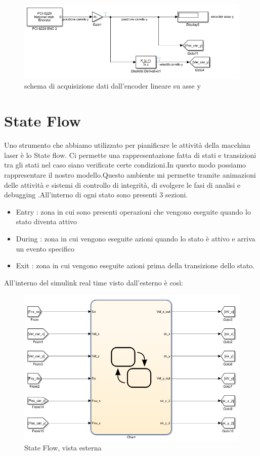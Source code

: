 \documentclass{article}
\begin{document}
\begin{figure}[H]
\centering
\includegraphics[width=.8\textwidth]{./simulink_real/banday.png}
\caption{schema di acquisizione dati dall'encoder lineare su asse y}
\end{figure}
\section{State Flow}

Uno strumento che abbiamo utilizzato per pianificare le attività della macchina laser è lo State flow. Ci permette una rappresentazione fatta di stati e transizioni tra gli stati nel caso siano verificate certe condizioni.In questo modo possiamo rappresentare il nostro modello.Questo ambiente mi permette tramite animazioni delle attività e sistemi di controllo di integrità, di svolgere le fasi di analisi e debugging .All'interno di ogni stato sono presenti 3 sezioni.
\begin{itemize}
    \item Entry : zona in cui sono presenti operazioni che vengono eseguite quando lo stato diventa attivo
    \item During : zona in cui vengono eseguite azioni quando lo stato è attivo e arriva un evento specifico
    \item Exit : zona in cui vengono eseguite azioni prima della transizione dello stato.
\end{itemize}
All'interno del simulink real time visto dall'esterno è così:

\begin{figure}[H]
\centering
\includegraphics[width=.6\textwidth]{./stateflow/stateflow.png}
\caption{State Flow, vista esterna}
\end{figure}
\end{document}
